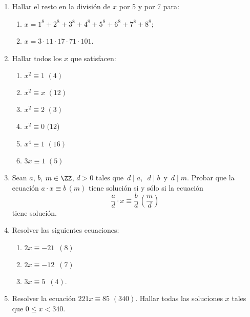 \documentclass[12pt,spanish,makeidx]{amsbook}
\begin{document}
\begin{enumerate}
\smallskip
\item Hallar el resto en la divisi\'on de $x$ por 5 y por 7 para:
 \begin{enumerate}
\item $x=1^8 + 2^8 + 3^8 + 4^8 + 5^8 + 6^8 + 7^8 + 8^8$;
\item $x=3\cdot 11\cdot 17\cdot 71\cdot 101$.
\end{enumerate}

\smallskip
\item Hallar todos los $x$ que satisfacen:
\begin{multicols}{3}
 \begin{enumerate}
  \item $x^2 \equiv 1\,\, (4)$
\item  $x^2 \equiv x\,\, (12)$
\item  $x^2 \equiv 2 \,\, (3)$
\item  $x^2 \equiv 0\,\, (12$)
\item  $x^4 \equiv 1 \,\, (16)$
\item  $3x \equiv 1\,\, (5)$
 \end{enumerate}
\end{multicols}

\item Sean $a$, $b$, $m \in {\ZZ}$, $d>0$ tales que  \,$d\mid a$,\,  \,$d\mid b$\, y \,$d\mid m$. Probar que la ecuaci\'on $a\cdot x \equiv b\,( m)$ tiene
soluci\'on si y s\'olo si la ecuaci\'on
\[ \frac{a}{d}\cdot x \equiv \frac{b}{d}\,\left(\frac{m}{d}\right)\]
tiene soluci\'on.

\smallskip
\item Resolver las siguientes ecuaciones:
\begin{multicols}{3}
 \begin{enumerate}
  \item $2x \equiv -21 \,\,\, (8)$
\item $2x \equiv -12 \,\,\, (7)$
\item $3x \equiv 5\,\,\, (4)$.
 \end{enumerate}
\end{multicols}

\smallskip
\item Resolver la ecuaci\'on $221 x \equiv 85\,\, (340)$. Hallar todas las soluciones $x$ tales que $0 \le x < 340$.


\end{enumerate}
\end{document}

